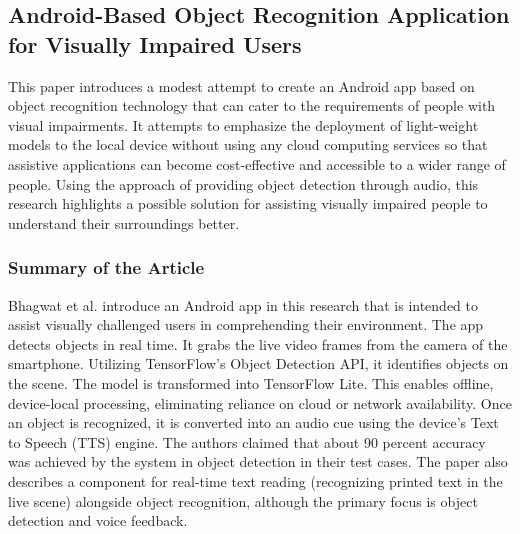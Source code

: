 \documentclass{FastFyp}
\begin{document}
\subsection{Android-Based Object Recognition Application for Visually Impaired Users}
This paper introduces a modest attempt to create an Android app based on object recognition technology that can cater to the requirements of people with visual impairments. It attempts to emphasize the deployment of light-weight models to the local device without using any cloud computing services so that assistive applications can become cost-effective and accessible to a wider range of people. Using the approach of providing object detection through audio, this research highlights a possible solution for assisting visually impaired people to understand their surroundings better.

\subsubsection{Summary of the Article}
Bhagwat et al. \cite{ref:salunkhe2021android} introduce an Android app in this research that is intended to assist visually challenged users in comprehending their environment. The app detects objects in real time. It grabs the live video frames from the camera of the smartphone. Utilizing TensorFlow's Object Detection API, it identifies objects on the scene. The model is transformed into TensorFlow Lite. This enables offline, device-local processing, eliminating reliance on cloud or network availability. Once an object is recognized, it is converted into an audio cue using the device's Text to Speech (TTS) engine. The authors claimed that about 90 percent accuracy was achieved by the system in object detection in their test cases. The paper also describes a component for real-time text reading (recognizing printed text in the live scene) alongside object recognition, although the primary focus is object detection and voice feedback.
\end{document}
